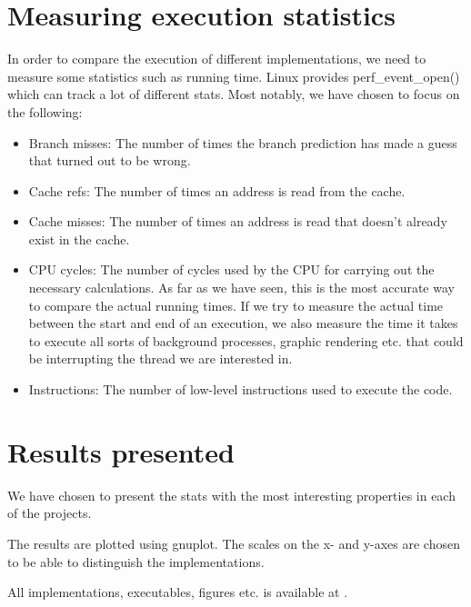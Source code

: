 \section{Measuring execution statistics} \label{section:perf_stat}
In order to compare the execution of different implementations, we need to
measure some statistics such as running time. 
Linux provides perf\_event\_open() \citep{perfStat} which can track a lot of
different stats. Most notably, we have chosen to focus on the following:
\begin{itemize}
 \item Branch misses: The number of times the branch prediction has made a guess
that turned out to be wrong.
 \item Cache refs: The number of times an address is read from the cache.
 \item Cache misses: The number of times an address is read that doesn't already
exist in the cache.
 \item CPU cycles: The number of cycles used by the CPU for carrying out the
necessary calculations. As far as we have seen, this is the most accurate way to
compare the actual running times. If we try to measure the actual time between
the start and end of an execution, we also measure the time it takes to execute
all sorts of background processes, graphic rendering etc. that could be
interrupting the thread we are interested in.
 
 \item Instructions: The number of low-level instructions used to execute the
code.
\end{itemize}




\section{Results presented}
We have chosen to present the stats with the most interesting properties in each
of the projects.

The results are plotted using gnuplot.
The scales on the x- and y-axes are chosen to be able to distinguish the
implementations.


All implementations, executables, figures etc. is available at \citep{github}.
